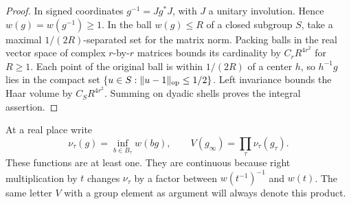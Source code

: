 \documentclass[a4paper,11pt]{article}
\theoremstyle{definition}
\theoremstyle{remark}
\numberwithin{equation}{section}
\begin{document}
\begin{proof}
In signed coordinates \(g^{-1}=Jg^*J\), with \(J\) a unitary
involution. Hence \(w(g)=w(g^{-1})\ge1\). In the ball
\(w(g)\le R\) of a closed subgroup \(S\), take a maximal
\(1/(2R)\)-separated set for the matrix norm. Packing balls
in the real vector space of complex \(r\)-by-\(r\) matrices
bounds its cardinality by \(C_rR^{4r^2}\) for \(R\ge1\).
Each point of the original ball is within \(1/(2R)\) of a
center \(h\), so \(h^{-1}g\) lies in the compact set
\(\{u\in S:\|u-1\|_{\rm op}\le1/2\}\).
Left invariance bounds the Haar volume by \(C_SR^{4r^2}\).
Summing on dyadic shells proves the integral assertion.
\end{proof}

At a real place write
\[
 \nu_\tau(g)=\inf_{b\in B_\tau}w(bg),\qquad
 V(g_\infty)=\prod_\tau\nu_\tau(g_\tau).
\]
These functions are at least one. They are continuous because
right multiplication by \(t\) changes \(\nu_\tau\) by a
factor between \(w(t^{-1})^{-1}\) and \(w(t)\). The same
letter \(V\) with a group element as argument will always
denote this product.
\end{document}
